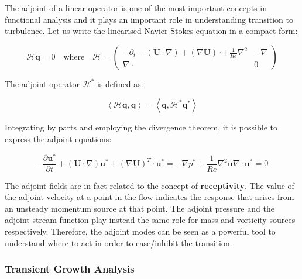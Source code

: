 The adjoint of a linear operator is one of the most important concepts in
functional analysis and it plays an important role in understanding transition to turbulence. Let us write the linearised Navier-Stokes equation in a compact form:

\begin{equation}
\mathcal{H}\mathbf{q}=0 \quad \mbox{where} \quad \mathcal{H}=\left( \begin{array}{c|c}
  -\partial_t-(\mathbf{U} \cdot \nabla)+ (\nabla \mathbf{U}) \cdot + \frac{1}{Re} \nabla^2 & -\nabla \\
  \hline
  \nabla \cdot  & 0
   \end{array}
 \right)
 \end{equation}


The adjoint operator $\mathcal{H}^*$ is defined as:

\begin{equation}
\left \langle \mathcal{H}\mathbf{q}, \mathbf{q} \right \rangle= \left \langle \mathbf{q}, \mathcal{H}^*\mathbf{q}^* \right \rangle
\end{equation}

Integrating by parts and employing the divergence theorem, it is possible to express the adjoint equations:

\begin{subequations}
\begin{equation}
-\frac{\partial \mathbf{u}^*}{\partial t}+(\mathbf{U} \cdot \nabla)\mathbf{u}^*+(\nabla \mathbf{U})^T \cdot \mathbf{u}^*=-\nabla p^*+\frac{1}{Re} \nabla^2 \mathbf{u}
\end{equation}

\begin{equation}
\nabla \cdot \mathbf{u}^*=0
\end{equation}
\end{subequations}

The adjoint fields are in fact related to the concept of \textbf{receptivity}. The value of the adjoint velocity at a point in the flow indicates the response that arises from an unsteady momentum source at that point. The adjoint pressure and the adjoint stream function play instead the same role for mass and vorticity sources respectively. Therefore, the adjoint modes can be seen as a powerful tool to understand where to act in order to ease/inhibit the transition.

\subsubsection{Transient Growth Analysis}

